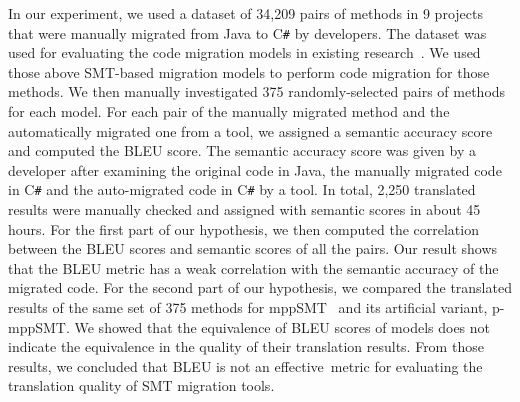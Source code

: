 In our experiment, we used a dataset of 34,209 pairs of methods in 9
projects that were manually migrated from Java to C\texttt{\#} by
developers. The dataset was used for evaluating the code migration
models in existing research~\cite{ase15}. We used those above
SMT-based migration models to perform code migration for those
methods. We then manually investigated 375 randomly-selected pairs of
methods for each model. For each pair of the manually migrated method
and the automatically migrated one from a tool, we assigned a semantic
accuracy score and computed the BLEU score. The semantic accuracy
score was given by a developer after examining the original code in
Java, the manually migrated code in C\texttt{\#} and the auto-migrated
code in C\texttt{\#} by a tool. In total, 2,250 translated results
were manually checked and assigned with semantic scores in about 45
hours. For the first part of our hypothesis, we then computed the
correlation between the BLEU scores and semantic scores of all the
pairs.  Our result shows that the BLEU metric has a weak correlation
with the semantic accuracy of the migrated code. For the second part of
our hypothesis, we compared the translated results of the same set of
375 methods for mppSMT~\cite{ase15} and its artificial variant,
p-mppSMT.
%
We showed that the equivalence of BLEU scores of models does not indicate 
the equivalence in the quality of their translation results.
From those results, we concluded that BLEU is not an effective~metric
for evaluating the translation quality of SMT migration tools.


